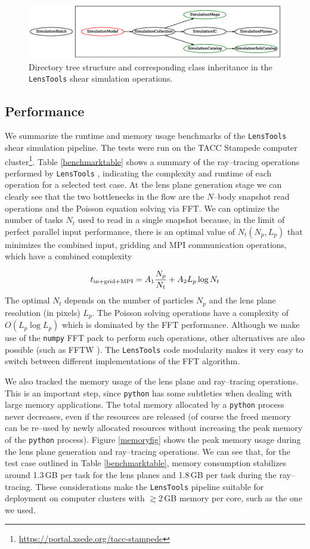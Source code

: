 \documentclass[reprint,aps,prd,superscriptaddress,showkeys,showpacs]{revtex4-1}
\newcommand{\ttt}[1]{\texttt{#1}}
\newcommand{\LT}{\texttt{LensTools} }
\begin{document}
\begin{figure}
\includegraphics[scale=0.6]{Figures/inheritance.eps}
\caption{Directory tree structure and corresponding class inheritance in the \LT shear simulation operations.}
\label{inheritance}
\end{figure}

\subsection{Performance}
%
We summarize the runtime and memory usage benchmarks of the \LT shear simulation pipeline. The tests were run on the TACC Stampede computer cluster\footnote{\url{https://portal.xsede.org/tacc-stampede}}. Table \ref{benchmarktable} shows a summary of the ray--tracing operations performed by \LT, indicating the complexity and runtime of each operation for a selected test case. At the lens plane generation stage we can clearly see that the two bottlenecks in the flow are the $N$--body snapshot read operations and the Poisson equation solving via FFT. We can optimize the number of tasks $N_t$ used to read in a single snapshot because, in the limit of perfect parallel input performance, there is an optimal value of $N_t(N_p,L_p)$ that minimizes the combined input, gridding and MPI communication operations, which have a combined complexity

\begin{equation}
t_{\rm in+grid+MPI} = A_1\frac{N_p}{N_t} + A_2L_p\log{N_t}
\end{equation} 
%
The optimal $N_t$ depends on the number of particles $N_p$ and the lens plane resolution (in pixels) $L_p$. The Poisson solving operations have a complexity of $O(L_p\log{L_p})$ which is dominated by the FFT performance. Although we make use of the \ttt{numpy} FFT pack \citep{scipy} to perform such operations, other alternatives are also possible (such as FFTW \citep{FFTW05}). The \LT code modularity makes it very easy to switch between different implementations of the FFT algorithm.  

We also tracked the memory usage of the lens plane and ray--tracing operations. This is an important step, since \ttt{python} has some subtleties when dealing with large memory applications. The total memory allocated by a \ttt{python} process never decreases, even if the resources are released (of course the freed memory can be re--used by newly allocated resources without increasing the peak memory of the \ttt{python} process). Figure \ref{memoryfig} shows the peak memory usage during the lens plane generation and ray--tracing operations. We can see that, for the test case outlined in Table \ref{benchmarktable}, memory consumption stabilizes around 1.3\,GB per task for the lens planes and 1.8\,GB per task during the ray--tracing. These considerations make the \LT pipeline suitable for deployment on computer clusters with $\gtrsim$2\,GB memory per core, such as the one we used.    
\end{document}
